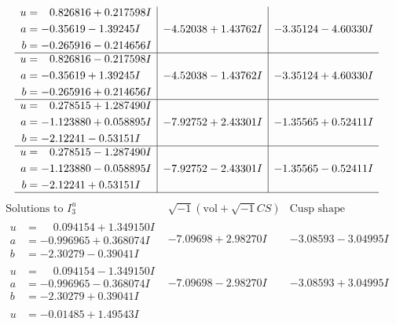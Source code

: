 \documentclass[1p]{elsarticle_modified}
\theoremstyle{definition}
\newcommand{\I}{\sqrt{-1}}
\begin{document}
$$\begin{array}{c|c|c}
\begin{aligned}
u &= \phantom{-}0.826816 + 0.217598 I \\
a &= -0.35619 - 1.39245 I \\
b &= -0.265916 - 0.214656 I\end{aligned}
 & -4.52038 + 1.43762 I & -3.35124 - 4.60330 I \\ \hline\begin{aligned}
u &= \phantom{-}0.826816 - 0.217598 I \\
a &= -0.35619 + 1.39245 I \\
b &= -0.265916 + 0.214656 I\end{aligned}
 & -4.52038 - 1.43762 I & -3.35124 + 4.60330 I \\ \hline\begin{aligned}
u &= \phantom{-}0.278515 + 1.287490 I \\
a &= -1.123880 + 0.058895 I \\
b &= -2.12241 - 0.53151 I\end{aligned}
 & -7.92752 + 2.43301 I & -1.35565 + 0.52411 I \\ \hline\begin{aligned}
u &= \phantom{-}0.278515 - 1.287490 I \\
a &= -1.123880 - 0.058895 I \\
b &= -2.12241 + 0.53151 I\end{aligned}
 & -7.92752 - 2.43301 I & -1.35565 - 0.52411 I\\
 \hline 
 \end{array}$$\newpage$$\begin{array}{c|c|c}  
\text{Solutions to }I^u_{3}& \I (\text{vol} + \sqrt{-1}CS) & \text{Cusp shape}\\
 \hline 
\begin{aligned}
u &= \phantom{-}0.094154 + 1.349150 I \\
a &= -0.996965 + 0.368074 I \\
b &= -2.30279 - 0.39041 I\end{aligned}
 & -7.09698 + 2.98270 I & -3.08593 - 3.04995 I \\ \hline\begin{aligned}
u &= \phantom{-}0.094154 - 1.349150 I \\
a &= -0.996965 - 0.368074 I \\
b &= -2.30279 + 0.39041 I\end{aligned}
 & -7.09698 - 2.98270 I & -3.08593 + 3.04995 I \\ \hline\begin{aligned}
u &= -0.01485 + 1.49543 I \\

\end{aligned}
\end{array}$$
\end{document}

